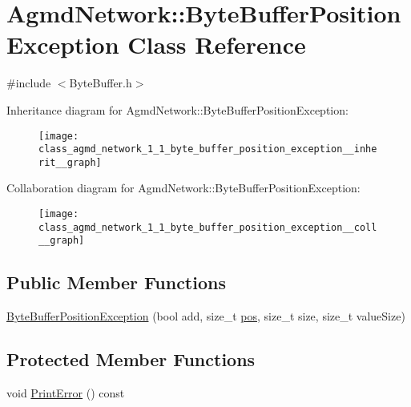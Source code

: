 \hypertarget{class_agmd_network_1_1_byte_buffer_position_exception}{\section{Agmd\+Network\+:\+:Byte\+Buffer\+Position\+Exception Class Reference}
\label{class_agmd_network_1_1_byte_buffer_position_exception}
}


{\ttfamily \#include $<$Byte\+Buffer.\+h$>$}



Inheritance diagram for Agmd\+Network\+:\+:Byte\+Buffer\+Position\+Exception\+:\nopagebreak
\begin{figure}[H]
\begin{center}
\leavevmode
\texttt{[image: class\_agmd\_network\_1\_1\_byte\_buffer\_position\_exception\_\_inherit\_\_graph]}
\end{center}
\end{figure}


Collaboration diagram for Agmd\+Network\+:\+:Byte\+Buffer\+Position\+Exception\+:\nopagebreak
\begin{figure}[H]
\begin{center}
\leavevmode
\texttt{[image: class\_agmd\_network\_1\_1\_byte\_buffer\_position\_exception\_\_coll\_\_graph]}
\end{center}
\end{figure}
\subsection*{Public Member Functions}
\begin{DoxyCompactItemize}
\item 
\hyperlink{class_agmd_network_1_1_byte_buffer_position_exception_ad9303c981d0147b003618ef8ae44d601}{Byte\+Buffer\+Position\+Exception} (bool add, size\+\_\+t \hyperlink{_examples_2_planet_2_app_8cpp_aa8a1c0491559faca4ebd0881575ae7f0}{pos}, size\+\_\+t size, size\+\_\+t value\+Size)
\end{DoxyCompactItemize}
\subsection*{Protected Member Functions}
\begin{DoxyCompactItemize}
\item 
void \hyperlink{class_agmd_network_1_1_byte_buffer_position_exception_a73ef2493df027f2a6b7786efbe6fa9de}{Print\+Error} () const 
\end{DoxyCompactItemize}
